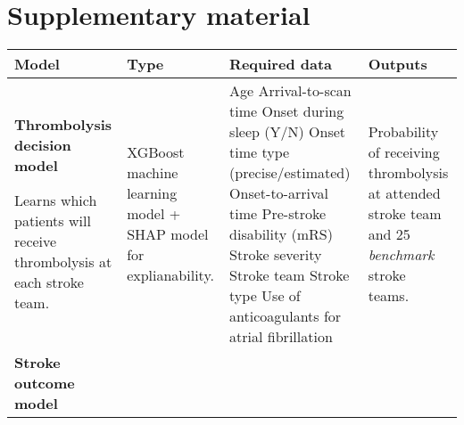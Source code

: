 \section{Supplementary material}

\begin{landscape}
{
\RaggedRight
\begin{table}
\small
\raggedright
\begin{tabular}{|p{5cm}|p{5cm}|p{6cm}|p{6cm}|}

\hline
\textbf{Model} &  \textbf{Type} & \textbf{Required data} & \textbf{Outputs} \\
\hline

\textbf{Thrombolysis decision model} 

\vspace{2mm}

Learns which patients will receive thrombolysis at each stroke team. & 

XGBoost machine learning model + SHAP model for explianability. & 

Age\newline\vspace{2pt}
Arrival-to-scan time\newline\vspace{2pt}
Onset during sleep (Y/N)\newline\vspace{2pt}
Onset time type (precise/estimated)\newline\vspace{2pt}
Onset-to-arrival time\newline\vspace{2pt}
Pre-stroke disability (mRS)\newline\vspace{2pt}
Stroke severity\newline\vspace{2pt}
Stroke team\newline\vspace{2pt}
Stroke type\newline\vspace{2pt}
Use of anticoagulants for atrial fibrillation & 

Probability of receiving thrombolysis at attended stroke team and 25 \textit{benchmark} stroke teams. \\

\hline


\textbf{Stroke outcome model}


\end{tabular}
\end{table}}
\end{landscape}
